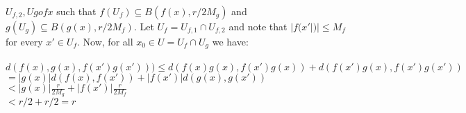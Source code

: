 \documentclass{article}
\newcommand\tab[1][1cm]{\hspace*{#1}}
\begin{document}
\begin{enumerate}[label=(\alph*)]
		\(U_{f,2},Ug of x \) such that \(f(U_{f}) \subseteq B(f(x),r/2M_{g})\) and \(g(U_{g}) \subseteq B(g(x),r/2M_{f})\). 
		Let \(U_{f} = U_{f,1} \cap U_{f,2}\) and note that \(|f(x'|)| ≤ M_{f}\) for every \(x' \in U_{f}\). 
		Now, for all \(x_{0} \in U = U_{f} \cap U_{g}\) we have: \\\\
		\tab[2cm] \(d(f(x),g(x), f(x')g(x'))) \le d(f(x)g(x), f(x')g(x)) + d(f(x')g(x), f(x')g(x'))\)\\
		\tab[6cm] \( = |g(x)|d(f(x),f(x')) + |f(x')|d(g(x),g(x'))\)\\
		\tab[6cm] \( < |g(x)| \frac{r}{2M_{g}} + |f(x')|\frac{r}{2M_{f}}\) \\
		\tab[6cm] \( < r/2 + r/2 = r\)
\end{enumerate}
\end{document}
